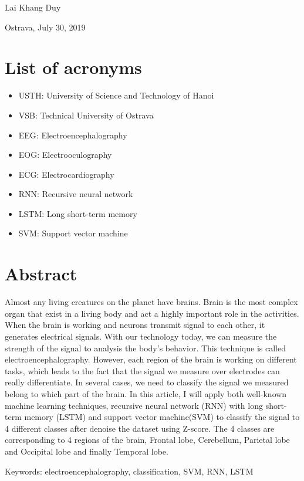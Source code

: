 \documentclass[12pt]{report}
\begin{document}
\bigskip
Lai Khang Duy

Ostrava, July 30, 2019
     

\listoffigures


\chapter*{List of acronyms}
    \begin{itemize}
        \item USTH: University of Science and Technology of Hanoi
        \item VSB: Technical University of Ostrava
        \item EEG: Electroencephalography
        \item EOG: Electrooculography
        \item ECG: Electrocardiography
        \item RNN: Recursive neural network
        \item LSTM: Long short-term memory
        \item SVM: Support vector machine
    \end{itemize}

\chapter*{Abstract}
Almost any living creatures on the planet have brains. Brain is the most complex organ that exist in a living body and act a highly important role in the activities. When the brain is working and neurons transmit signal to each other, it generates electrical signals. With our technology today, we can measure the strength of the signal to analysis the body's behavior. This technique is called electroencephalography. However, each region of the brain is working on different tasks, which leads to the fact that the signal we measure over electrodes can really differentiate. In several cases, we need to classify the signal we measured belong to which part of the brain. In this article, I will apply both well-known machine learning techniques, recursive neural network (RNN) with long short-term memory (LSTM) and support vector machine(SVM) to classify the signal to 4 different classes after denoise the dataset using Z-score. The 4 classes are corresponding to 4 regions of the brain, Frontal lobe, Cerebellum, Parietal lobe and Occipital lobe and finally Temporal lobe.

\bigskip
Keywords: electroencephalography, classification, SVM, RNN, LSTM 
     
\end{document}
